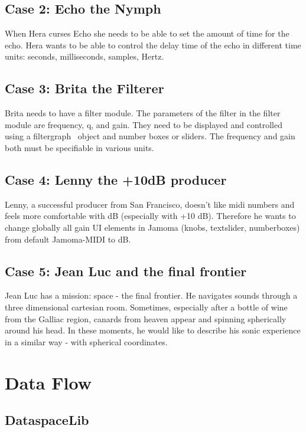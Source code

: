 \documentclass[]{article}
\begin{document}
\subsection{Case 2: Echo the Nymph}

When Hera curses Echo she needs to be able to set the amount of time for the echo.  Hera wants to be able to control the delay time of the echo in different time units: seconds, milliseconds, samples, Hertz.


\subsection{Case 3: Brita the Filterer}

Brita needs to have a filter module.  The parameters of the filter in the filter module are frequency, q, and gain.  They need to be displayed and controlled using a filtergraph~ object and number boxes or sliders.  The frequency and gain both must be specifiable in various units.

\subsection{Case 4: Lenny the +10dB producer}
Lenny, a successful producer from San Francisco, doesn't like midi numbers and feels more comfortable with dB (especially with +10 dB). Therefore he wants to change globally all gain UI elements in Jamoma  (knobs, textslider, numberboxes) from default Jamoma-MIDI to dB. 

\subsection{Case 5: Jean Luc and the final frontier}
Jean Luc has a mission: space - the final frontier. He navigates sounds through a three dimensional cartesian room. Sometimes, especially after a bottle of wine from the Galliac region, canards from heaven appear and spinning spherically around his head. In these moments, he would like to describe his sonic experience in a similar way - with spherical coordinates. 


\section{Data Flow}

\subsection{DataspaceLib}
\end{document}
